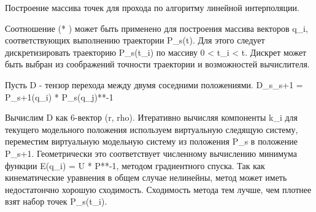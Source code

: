 \documentclass{article}
\begin{document}
Построение массива точек для прохода по алгоритму линейной интерполяции. 

Соотношение (* ) может быть применено для построения массива векторов q\_i, соответствующих выполнению траектории P\_s(t). Для этого следует дискретизировать траекторию P\_s(t\_i) по массиву 0 < t\_i < t. Дискрет может быть выбран из соображений точности траектории и возможностей вычислителя.

Пусть D - тензор перехода между двумя соседними положениями.
D\_s\_s+1 = P\_s+1(q\_i) * P\_s(q\_j)**-1

Вычислим D как 6-вектор (r, rho). Итеративно вычисляя компоненты k\_i для текущего модельного положения используем виртуальную следящую систему, переместим виртуальную модельную систему из положения P\_s в положение P\_s+1. Геометрически это соответствует численному вычислению минимума функции E(q\_i) = U * P**-1, методом градиентного спуска. Так как кинематические уравнения в общем случае нелинейны, метод может иметь недостатончно хорошую сходимость. Сходимость метода тем лучше, чем плотнее взят набор точек P\_s(t\_i).  
\end{document}
